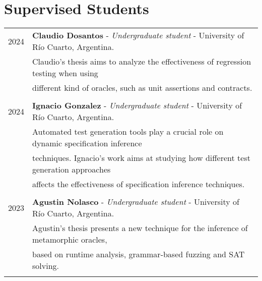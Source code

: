 \documentclass[a4paper,10pt]{article} %
\begin{document}


\section{Supervised Students}
\begin{longtable}{rl}

2024 & \textbf{Claudio Dosantos} - \textit{Undergraduate student} - University of Río Cuarto, Argentina. \\
& Claudio's thesis aims to analyze the effectiveness of regression testing when using \\ 
& different kind of oracles, such as unit assertions and contracts. \\ & \\

2024 & \textbf{Ignacio Gonzalez} - \textit{Undergraduate student} - University of Río Cuarto, Argentina. \\
& Automated test generation tools play a crucial role on dynamic specification inference \\ 
& techniques. Ignacio's work aims at studying how different test generation approaches \\ 
& affects the effectiveness of specification inference techniques. \\ & \\

2023 & \textbf{Agustin Nolasco} - \textit{Undergraduate student} - University of Río Cuarto, Argentina. \\ 
& Agustin's thesis presents a new technique for the inference of metamorphic oracles, \\ 
& based on runtime analysis, grammar-based fuzzing and SAT solving. \\ & \\

\end{longtable}
\end{document}

